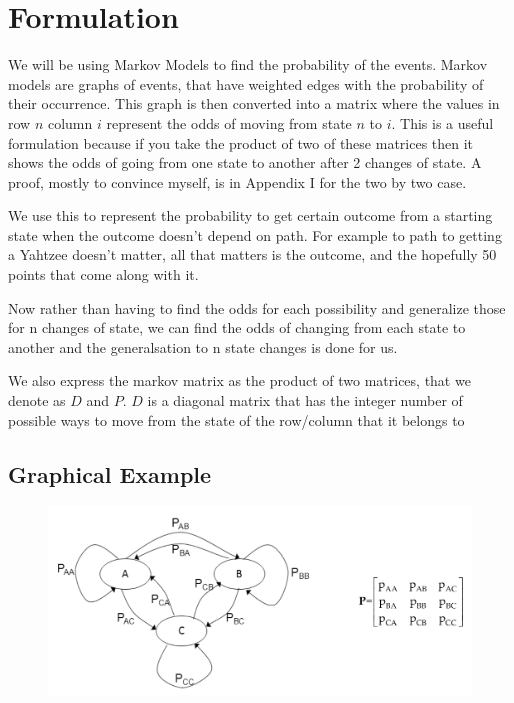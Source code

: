 
\section{Formulation}
	
	We will be using Markov Models to find the probability of the events. 
Markov models are graphs of events, that have weighted edges with the probability of their occurrence. 
This graph is then converted into a matrix where the values in row $n$ column $i$ represent the odds of moving from state $n$ to $i$. 
This is a useful formulation because if you take the product of two of these matrices then it shows the odds of going from one state to another after 2 changes of state. 
A proof, mostly to convince myself, is in Appendix I for the two by two case.

We use this to represent the probability to get certain outcome from a starting state when the outcome doesn't depend on path. For example to path to getting a Yahtzee doesn't matter, all that matters is the outcome, and the hopefully 50 points that come along with it. 

Now rather than having to find the odds for each possibility and generalize those for n changes of state, we can find the odds of changing from each state to another and the generalsation to n state changes is done for us. 

We also express the markov matrix as the product of two matrices, that we denote as $D$ and $P$. $D$ is a diagonal matrix that has the integer number of possible ways to move from the state of the row/column that it belongs to

\subsection{Graphical Example}

\begin{figure}
  \includegraphics[width=\linewidth]{image11.jpeg}
  \label{Figure 1: Probability transition diagram for a 3-state Markov chain}
\end{figure}

